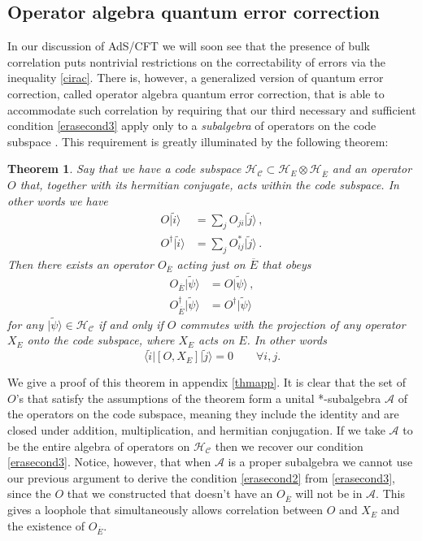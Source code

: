 \documentclass[12pt]{article}
\newcommand{\be}{\begin{equation}}
\newcommand{\ee}{\end{equation}}
\newcommand{\HC}{\mathcal{H}_{\mathcal{C}}}
\newcommand{\lan}{\langle}
\newcommand{\ran}{\rangle}
\newcommand{\wt}{\widetilde}
\newcommand{\ol}{\overline}
\newtheorem*{theorem}{Theorem}
\begin{document}
\subsection{Operator algebra quantum error correction}\label{opalgsec}
In our discussion of AdS/CFT we will soon see that the presence of bulk correlation puts nontrivial restrictions on the correctability of errors via the inequality \eqref{cirac}.  There is, however, a generalized version of quantum error correction, called operator algebra quantum error correction, that is able to accommodate such correlation by requiring that our third necessary and sufficient condition \eqref{erasecond3} apply only to a \textit{subalgebra} of operators on the code subspace \cite{beny2007generalization,beny2007quantum}.  This requirement is greatly illuminated by the following theorem:
\begin{theorem}
Say that we have a code subspace $\HC \subset \mathcal{H}_E \otimes \mathcal{H}_{\ol E}$ and an operator $O$ that, together with its hermitian conjugate, acts within the code subspace.  In other words we have
\begin{align}\nonumber
O|\wt{i}\ran&=\sum_j O_{ji}|\wt{j}\ran \,,\\
O^\dagger|\wt{i}\ran&=\sum_j O^*_{ij}|\wt{j}\ran \,.
\end{align}
Then there exists an operator $O_{\ol{E}}$ acting just on $\ol{E}$ that obeys
\begin{align}\nonumber
O_{\ol{E}}|\wt{\psi}\ran&=O|\wt{\psi}\ran \,,\\
O_{\ol{E}}^\dagger|\wt{\psi}\ran&=O^\dagger|\wt{\psi}\ran \label{opalg}
\end{align}
for any $|\wt{\psi}\ran\in \HC$ if and only if $O$ commutes with the projection of any operator $X_E$ onto the code subspace, where $X_E$ acts on $E$.  In other words
\be\label{commreq}
\lan\wt{i}|[O,X_E]|\wt{j}\ran=0  \qquad \forall i,j.
\ee
\end{theorem}
We give a proof of this theorem in appendix \ref{thmapp}.  It is clear that the set of $O$'s that satisfy the assumptions of the theorem form a unital *-subalgebra $\mathcal{A}$ of the operators on the code subspace, meaning they include the identity and are closed under addition, multiplication, and hermitian conjugation.   If we take $\mathcal{A}$ to be the entire algebra of operators on $\HC$ then we recover our condition \eqref{erasecond3}.  Notice, however, that when $\mathcal{A}$ is a proper subalgebra we cannot use our previous argument to derive the condition \eqref{erasecond2} from \eqref{erasecond3}, since the $O$ that we constructed that doesn't have an $O_{\ol{E}}$ will not be in $\mathcal{A}$.  This gives a loophole that simultaneously allows correlation between $O$ and $X_E$ and the existence of $O_{\ol{E}}$.  
\end{document}
